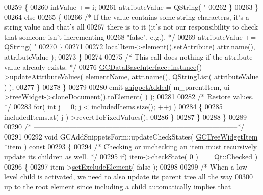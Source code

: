 \begin{DoxyCode}
00259             \{
00260               intValue += i;
00261               attributeValue = QString( \textcolor{stringliteral}{"%
00262             \}
00263           \}
00264           \textcolor{keywordflow}{else}
00265           \{
00266             \textcolor{comment}{/* If the value contains some string characters, it's a string
       value and that's all}
00267 \textcolor{comment}{              there is to it (it's not our responsibility to check that someone
       isn't incrementing}
00268 \textcolor{comment}{              "false", e.g.). */}
00269             attributeValue += QString( \textcolor{stringliteral}{"%
00270           \}
00271 
00272           localItem->\hyperlink{class_g_c_tree_widget_item_a584cad866bdbd94710d31eb77b804d84}{element}().setAttribute( attr.name(), attributeValue );
00273         \}
00274 
00275         \textcolor{comment}{/* This call does nothing if the attribute value already exists. */}
00276         \hyperlink{class_g_c_data_base_interface_a1baea9c0667aa8b610ec30076fcab84c}{GCDataBaseInterface::instance}()->\hyperlink{class_g_c_data_base_interface_ae4f158875b5a8a109d301f19ce5d21ae}{updateAttributeValues}( elementName, 
      attr.name(), QStringList( attributeValue ) );
00277       \}      
00278     \}
00279 
00280     emit \hyperlink{class_g_c_add_snippets_form_ae911d230e14e1473223a6f2b087febef}{snippetAdded}( m\_parentItem, ui->treeWidget->cloneDocument().toElement(
      ) );
00281 
00282     \textcolor{comment}{/* Restore values. */}
00283     \textcolor{keywordflow}{for}( \textcolor{keywordtype}{int} j = 0; j < includedItems.size(); ++j )
00284     \{
00285       includedItems.at( j )->revertToFixedValues();
00286     \}
00287   \}
00288 \}
00289 
00290 \textcolor{comment}{/*
      --------------------------------------------------------------------------------------*/}
00291 
00292 \textcolor{keywordtype}{void} GCAddSnippetsForm::updateCheckStates( \hyperlink{class_g_c_tree_widget_item}{GCTreeWidgetItem} *item )\textcolor{keyword}{ const}
00293 \textcolor{keyword}{}\{
00294   \textcolor{comment}{/* Checking or unchecking an item must recursively update its children as
       well. */}
00295   \textcolor{keywordflow}{if}( item->checkState( 0 ) == Qt::Checked )
00296   \{
00297     item->\hyperlink{class_g_c_tree_widget_item_a4c1932884c3e7c0da8be9e2582e02f41}{setExcludeElement}( \textcolor{keyword}{false} );
00298 
00299     \textcolor{comment}{/* When a low-level child is activated, we need to also update its parent
       tree all the way}
00300 \textcolor{comment}{      up to the root element since including a child automatically implies that
}}}
\end{DoxyCode}
